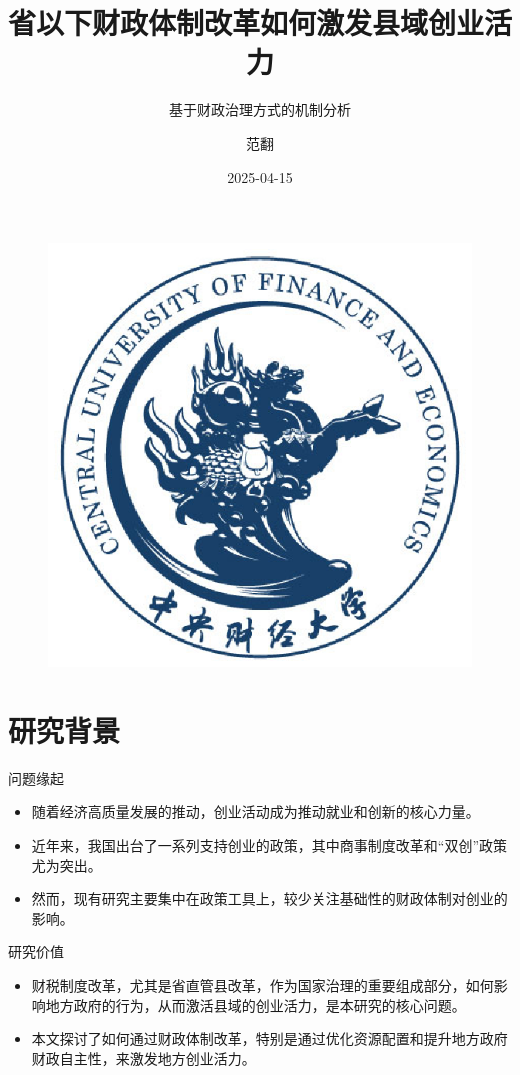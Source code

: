 \documentclass{beamer}
\title{省以下财政体制改革如何激发县域创业活力}
\subtitle{基于财政治理方式的机制分析}
\author{范翻}
\institute{中国财政发展协同创新中心}
\date{2025-04-15}
\newcommand{\tightlist}{%
  \setlength{\itemsep}{0pt}\setlength{\parskip}{0pt}}
\begin{document}
\kaishu  %
\begin{frame}
  \titlepage
  \begin{figure}[htpb]
    \centering
    \includegraphics[width=0.2\linewidth]{pic/cufe_logo_blue.eps}
  \end{figure}
\end{frame}



\section{研究背景}\label{ux7814ux7a76ux80ccux666f}

\begin{frame}{问题缘起}
\label{ux95eeux9898ux7f18ux8d77}
\begin{itemize}
\tightlist
\item
  随着经济高质量发展的推动，创业活动成为推动就业和创新的核心力量。
\item
  近年来，我国出台了一系列支持创业的政策，其中商事制度改革和``双创''政策尤为突出。
\item
  然而，现有研究主要集中在政策工具上，较少关注基础性的财政体制对创业的影响。
\end{itemize}
\end{frame}

\begin{frame}{研究价值}
\label{ux7814ux7a76ux4ef7ux503c}
\begin{itemize}
\tightlist
\item
  财税制度改革，尤其是省直管县改革，作为国家治理的重要组成部分，如何影响地方政府的行为，从而激活县域的创业活力，是本研究的核心问题。
\item
  本文探讨了如何通过财政体制改革，特别是通过优化资源配置和提升地方政府财政自主性，来激发地方创业活力。
\end{itemize}
\end{frame}
\end{document}
